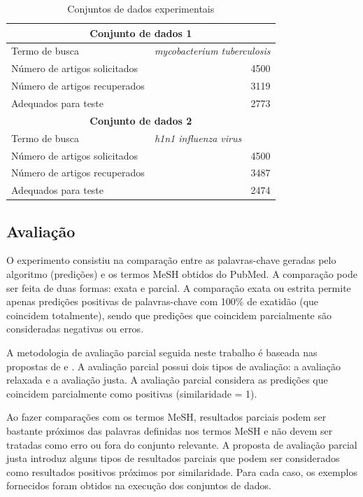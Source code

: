 \begin{table}[htbp]
\center
\begin{tabular}{|l|r|}
\hline
\multicolumn{ 2}{|c|}{\textbf{Conjunto de dados 1}} \\ \hline
Termo de busca & \multicolumn{1}{l|}{\textit{mycobacterium tuberculosis}} \\ \hline
Número de artigos solicitados & 4500 \\ \hline
Número de artigos recuperados & 3119 \\ \hline
Adequados para teste & 2773 \\ \hline
\multicolumn{ 2}{|c|}{\textbf{Conjunto de dados 2}} \\ \hline
Termo de busca & \multicolumn{1}{l|}{\textit{h1n1 influenza virus}} \\ \hline
Número de artigos solicitados & 4500 \\ \hline
Número de artigos recuperados & 3487 \\ \hline
Adequados para teste & 2474 \\ \hline
\end{tabular}
\caption{Conjuntos de dados experimentais}
\label{tab:datasetsTeste}
\end{table}

\subsection{Avaliação}
O experimento consistiu na comparação entre as palavras-chave geradas pelo algoritmo (predições) e os termos MeSH obtidos do PubMed. A comparação pode ser feita de duas formas: exata e parcial. A comparação exata ou estrita permite apenas predições positivas de palavras-chave com 100\% de exatidão (que coincidem totalmente), sendo que predições que coincidem parcialmente são consideradas negativas ou erros. 

A metodologia de avaliação parcial seguida neste trabalho é baseada nas propostas de \cite{Chinchor1995} e \cite{Tsai2006}. A avaliação parcial possui dois tipos de avaliação: a avaliação relaxada e a avaliação justa. A avaliação parcial considera as predições que coincidem parcialmente como positivas (similaridade = 1).

Ao fazer comparações com os termos MeSH, resultados parciais podem ser bastante próximos das palavras definidas nos termos MeSH e não devem ser tratadas como erro ou fora do conjunto relevante. A proposta de avaliação parcial justa introduz alguns tipos de resultados parciais que podem ser considerados como resultados positivos próximos por similaridade. Para cada caso, os exemplos fornecidos foram obtidos na execução dos conjuntos de dados.

